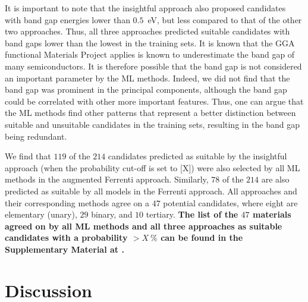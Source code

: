 \documentclass[superscriptaddress,unsortedaddress,
 amsmath,amssymb,
 aps,
]{revtex4-2}
\newcommand{\oliver}[1]{\textcolor{violet}{#1}}
\begin{document}
It is important to note that the insightful approach also proposed candidates with band gap energies lower than $0.5$~eV, but less compared to that of the other two approaches. Thus, all three approaches predicted suitable candidates with band gaps lower than the lowest in the training sets. 
It is known that the GGA functional Materials Project applies is known to underestimate the band gap of many semiconductors. 
It is therefore possible that the band gap is not considered an important parameter by the ML methods. 
Indeed, we did not find that the band gap was prominent in the principal components, although the band gap could be correlated with other more important features. 
Thus, one can argue that the ML methods find other patterns that represent a better distinction between suitable and unsuitable candidates in the training sets, resulting in the band gap being redundant.

We find that $119$ of the $214$ candidates predicted as suitable by the insightful approach (when the probability cut-off is set to [X]) were also selected by all ML methods in the augmented Ferrenti approach. 
Similarly, $78$ of the $214$ are also predicted as suitable by all models in the Ferrenti approach. All approaches and their corresponding methods agree on a $47$ potential candidates, where eight are elementary (unary), $29$ binary, and $10$ tertiary.
\textbf{The list of the $47$ materials agreed on by all ML methods and all three approaches as suitable candidates with a probability $> X \ \%$ can be found in the Supplementary Material at \cite{supplementary}.} 


\section*{Discussion} 

\end{document}
